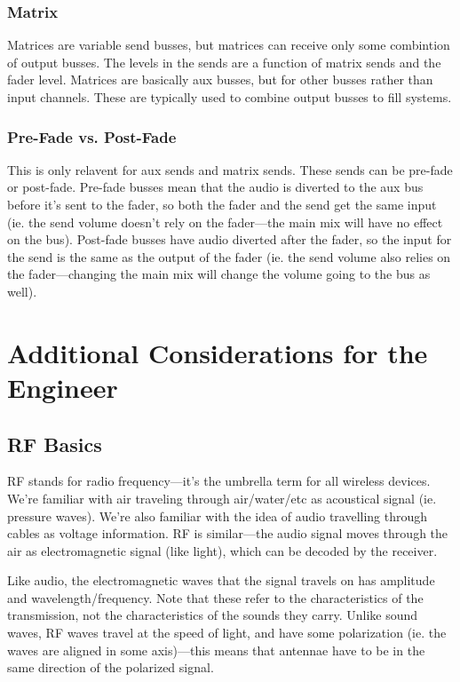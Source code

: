 \documentclass[a4paper]{article}
\begin{document}
\subsubsection{Matrix}
Matrices are variable send busses, but matrices can receive only some
combintion of output busses. The levels in the sends are a function of matrix
sends and the fader level. Matrices are basically aux busses, but for other
busses rather than input channels. These are typically used to combine output
busses to fill systems.

\subsubsection{Pre-Fade vs. Post-Fade}
This is only relavent for aux sends and matrix sends. These sends can be
pre-fade or post-fade. Pre-fade busses mean that the audio is diverted to the
aux bus before it's sent to the fader, so both the fader and the send get
the same input (ie. the send volume doesn't rely on the fader---the main mix
will have no effect on the bus). Post-fade
busses have audio diverted after the fader, so the input for the send is the
same as the output of the fader (ie. the send volume also relies on the
fader---changing the main mix will change the volume going to the bus as well).

\section[Additional Considerations]{Additional Considerations for the Engineer}

\subsection{RF Basics}
RF stands for radio frequency---it's the umbrella term for all wireless
devices. We're familiar with air traveling through air/water/etc as acoustical
signal (ie. pressure waves). We're also familiar with the idea of audio
travelling through cables as voltage information. RF is similar---the audio
signal moves through the air as electromagnetic signal (like light), which can
be decoded by the receiver. 

Like audio, the electromagnetic waves that the signal travels on has amplitude
and wavelength/frequency. Note that these refer to the characteristics of the
transmission, not the characteristics of the sounds they carry. Unlike sound
waves, RF waves travel
at the speed of light, and have some polarization (ie. the waves are aligned in
some axis)---this means that antennae have to be in the same direction of the
polarized signal.
\end{document}
